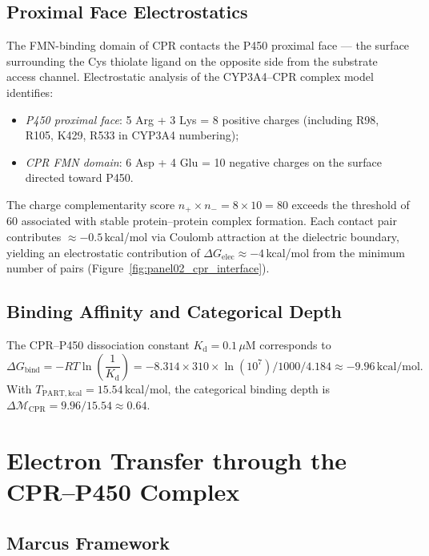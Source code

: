\documentclass[11pt,twocolumn,a4paper]{article}
\theoremstyle{definition}
\theoremstyle{remark}
\newcommand{\depth}{\mathcal{M}}
\begin{document}
\subsection{Proximal Face Electrostatics}

The FMN-binding domain of CPR contacts the P450 proximal face — the surface
surrounding the Cys thiolate ligand on the opposite side from the substrate
access channel. Electrostatic analysis of the CYP3A4--CPR complex model
identifies:
\begin{itemize}
  \item \textit{P450 proximal face}: 5 Arg + 3 Lys = 8 positive charges
    (including R98, R105, K429, R533 in CYP3A4 numbering);
  \item \textit{CPR FMN domain}: 6 Asp + 4 Glu = 10 negative charges on the
    surface directed toward P450.
\end{itemize}
The charge complementarity score $n_+ \times n_- = 8 \times 10 = 80$ exceeds
the threshold of 60 associated with stable protein--protein complex formation.
Each contact pair contributes $\approx -0.5$\,kcal/mol via Coulomb attraction
at the dielectric boundary, yielding an electrostatic contribution of
$\Delta G_\mathrm{elec} \approx -4$\,kcal/mol from the minimum number of pairs
(Figure~\ref{fig:panel02_cpr_interface}).

\subsection{Binding Affinity and Categorical Depth}

The CPR--P450 dissociation constant $K_\mathrm{d} = 0.1\,\mu\mathrm{M}$
\citep{kenaan2011} corresponds to
\begin{equation}
  \Delta G_\mathrm{bind} = -RT\ln\!\left(\frac{1}{K_\mathrm{d}}\right)
  = -8.314 \times 310 \times \ln(10^7) / 1000 / 4.184
  \approx -9.96\,\text{kcal/mol}.
\end{equation}
With $T_\mathrm{PART,kcal} = 15.54$\,kcal/mol, the categorical binding depth is
$\Delta\depth_\mathrm{CPR} = 9.96/15.54 \approx 0.64$.

\section{Electron Transfer through the CPR--P450 Complex}

\subsection{Marcus Framework}
\end{document}
